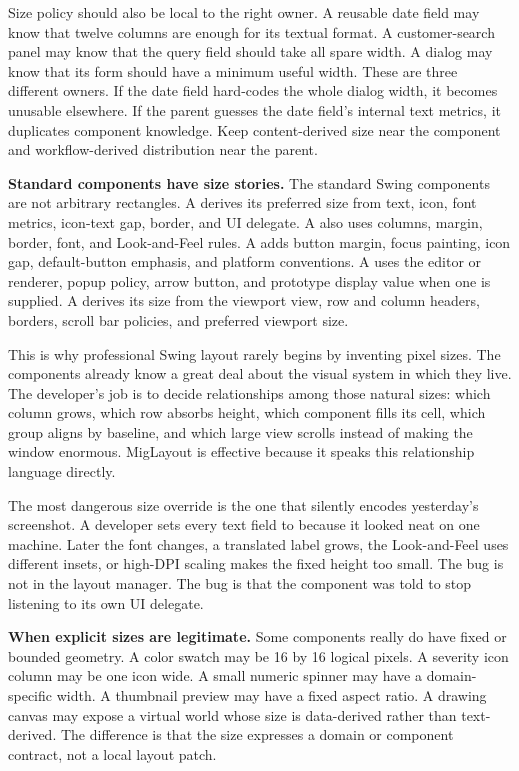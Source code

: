 Size policy should also be local to the right owner. A reusable date field may know that twelve columns are enough for its textual format. A customer-search panel may know that the query field should take all spare width. A dialog may know that its form should have a minimum useful width. These are three different owners. If the date field hard-codes the whole dialog width, it becomes unusable elsewhere. If the parent guesses the date field's internal text metrics, it duplicates component knowledge. Keep content-derived size near the component and workflow-derived distribution near the parent.

\textbf{Standard components have size stories.} The standard Swing components are not arbitrary rectangles. A 
derives its preferred size from text, icon, font metrics, icon-text gap, border,
and UI delegate. A  also uses columns, margin, border, font, and
Look-and-Feel rules. A  adds button margin, focus painting, icon
gap, default-button emphasis, and platform conventions. A  uses
the editor or renderer, popup policy, arrow button, and prototype display value
when one is supplied. A  derives its size from the viewport
view, row and column headers, borders, scroll bar policies, and preferred
viewport size.

This is why professional Swing layout rarely begins by inventing pixel sizes.
The components already know a great deal about the visual system in which they
live. The developer's job is to decide relationships among those natural sizes:
which column grows, which row absorbs height, which component fills its cell,
which group aligns by baseline, and which large view scrolls instead of making
the window enormous. MigLayout is effective because it speaks this relationship
language directly.

The most dangerous size override is the one that silently encodes yesterday's
screenshot. A developer sets every text field to 
because it looked neat on one machine. Later the font changes, a translated
label grows, the Look-and-Feel uses different insets, or high-DPI scaling makes
the fixed height too small. The bug is not in the layout manager. The bug is
that the component was told to stop listening to its own UI delegate.

\textbf{When explicit sizes are legitimate.} Some components really do have fixed or bounded geometry. A color swatch may be
16 by 16 logical pixels. A severity icon column may be one icon wide. A small
numeric spinner may have a domain-specific width. A thumbnail preview may have
a fixed aspect ratio. A drawing canvas may expose a virtual world whose size is
data-derived rather than text-derived. The difference is that the size expresses
a domain or component contract, not a local layout patch.

